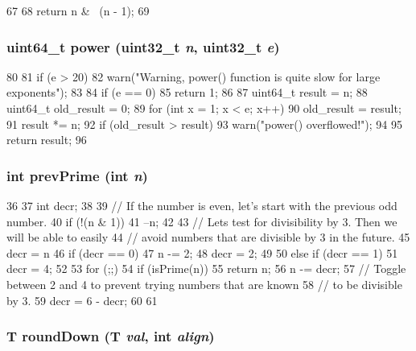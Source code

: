 \begin{DoxyCode}
67 {
68     return n & ~(n - 1);
69 }
\end{DoxyCode}
\hypertarget{intmath_8hh_a4e6a30fd4eed8d942ab7fa676da00e69}{
\subsubsection[{power}]{\setlength{\rightskip}{0pt plus 5cm}uint64\_\-t power ({\bf uint32\_\-t} {\em n}, \/  {\bf uint32\_\-t} {\em e})}}
\label{intmath_8hh_a4e6a30fd4eed8d942ab7fa676da00e69}



\begin{DoxyCode}
80 {
81     if (e > 20)
82         warn("Warning, power() function is quite slow for large exponents\n");
83 
84     if (e == 0)
85         return 1;
86 
87     uint64_t result = n;
88     uint64_t old_result = 0;
89     for (int x = 1; x < e; x++) {
90         old_result = result;
91         result *= n;
92         if (old_result > result)
93             warn("power() overflowed!\n");
94     }
95     return result;
96 }
\end{DoxyCode}
\hypertarget{intmath_8hh_a10cb95b0267273bc74bad625fd898a7a}{
\subsubsection[{prevPrime}]{\setlength{\rightskip}{0pt plus 5cm}int prevPrime (int {\em n})}}
\label{intmath_8hh_a10cb95b0267273bc74bad625fd898a7a}



\begin{DoxyCode}
36 {
37     int decr;
38 
39     // If the number is even, let's start with the previous odd number.
40     if (!(n & 1))
41         --n;
42 
43     // Lets test for divisibility by 3.  Then we will be able to easily
44     // avoid numbers that are divisible by 3 in the future.
45     decr = n %
46     if (decr == 0) {
47         n -= 2;
48         decr = 2;
49     }
50     else if (decr == 1)
51         decr = 4;
52 
53     for (;;) {
54         if (isPrime(n))
55             return n;
56         n -= decr;
57         // Toggle between 2 and 4 to prevent trying numbers that are known
58         // to be divisible by 3.
59         decr = 6 - decr;
60     }
61 }
\end{DoxyCode}
\hypertarget{intmath_8hh_a343c19b0ae885d5f3c7960987096e9d5}{
\subsubsection[{roundDown}]{\setlength{\rightskip}{0pt plus 5cm}T roundDown (T {\em val}, \/  int {\em align})}}
\label{intmath_8hh_a343c19b0ae885d5f3c7960987096e9d5}



